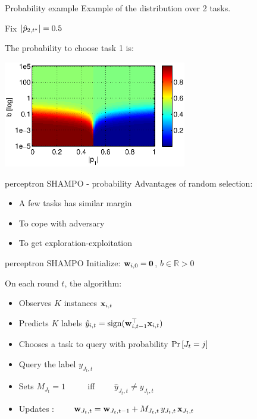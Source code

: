 \documentclass{beamer}
\begin{document}
\begin{frame}{ Probability example}
Example of the distribution over 2 tasks.\newline

Fix $\left\vert{\hat{p}_{2,t^*}}\right\vert=0.5$\newline

The probability to choose task 1 is:
\begin{center}
\includegraphics[width=0.60\textwidth]{figs/probability.eps}
\end{center}
\end{frame}

\begin{frame}{perceptron SHAMPO - probability}
Advantages of   random selection:\newline
\begin{itemize}
\item A few tasks has  similar  margin\newline
\item To cope with adversary\newline
\item To get  exploration-exploitation
\end{itemize}
\end{frame}

\begin{frame}{perceptron SHAMPO }
Initialize: $\mathbf{w}_{i,0}={\boldsymbol{0}}$, $b\in\mathbb{R}>0$\newline

On each round $t$, the algorithm: \newline
\begin{itemize}
\item Observes $K$ instances $\mathbf{x}_{i,t}$  \newline
\item Predicts $K$ labels  $\hat{y}_{i,t}={\rm sign}{({\mathbf{w}}^{\top}_{i,t-1} \mathbf{x}_{i,t})}$ \newline
\item Chooses a task to query  with probability  ${\rm Pr}\left[{J_t=j}\right]$  \newline
\item Query the label $y_{J_t,t}$ \newline
\item Sets $M_{J_t}=1$ ~~~~ iff~~~~ $\hat{y}_{J_t,t}\ne y_{J_t,t}$\newline
\item Updates :~~~~
$\mathbf{w}_{J_t,t} =\mathbf{w}_{J_t,t-1}+M_{J_t,t} \,y_{J_t,t}\, \mathbf{x}_{J_t,t}$
\end{itemize}
\end{frame}
\end{document}
